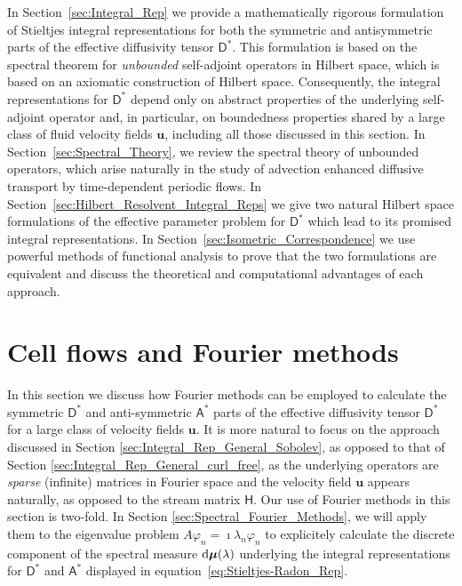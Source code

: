 \documentclass[leqno,onefignum,onetabnum]{siamltex1213}
\newcommand{\secref}[1]{Section~\ref{#1}}
\renewcommand{\d}{\mathrm{d}}
\newcommand{\Dm}{\mathsf{D}}
\newcommand{\Hm}{\mathsf{H}}
\newcommand{\Am}{\mathsf{A}}
\newcommand\bmu{\mbox{\boldmath${\mu}$}}
\newcommand{\vecu}{\boldsymbol{u}}
\begin{document}
In \secref{sec:Integral_Rep} we provide a mathematically rigorous
formulation of Stieltjes integral representations for both the
symmetric and antisymmetric parts of the effective diffusivity tensor
$\Dm^*$. This formulation is based on the spectral theorem for
\emph{unbounded} self-adjoint operators in  Hilbert space, which is
based on an axiomatic construction of Hilbert 
space. Consequently, the integral representations for $\Dm^*$ depend
only on abstract properties of the underlying self-adjoint operator
and, in particular, on boundedness properties shared by a large
class of fluid velocity fields $\vecu$, including all those
discussed in this section. In \secref{sec:Spectral_Theory}, we
review the spectral theory of unbounded operators, which arise
naturally in the study of advection enhanced diffusive transport by
time-dependent periodic flows. In
\secref{sec:Hilbert_Resolvent_Integral_Reps} we give two natural
Hilbert space formulations of the effective parameter problem for
$\Dm^*$ which lead to its promised integral representations. In
\secref{sec:Isometric_Correspondence} we use powerful methods of
functional analysis to prove that the two formulations are equivalent
and discuss the theoretical and computational advantages of each
approach.  




\section{Cell flows and Fourier methods}\label{sec:Fourier_Methods}
%
In this section we discuss how Fourier methods can be employed to
calculate the symmetric $\Dm^*$ and anti-symmetric $\Am^*$
parts of the effective diffusivity tensor $\Dm^*$ for a large class
of velocity fields $\vecu $. It is more natural  to focus on the
approach discussed in Section \ref{sec:Integral_Rep_General_Sobolev},
as opposed to that of Section
\ref{sec:Integral_Rep_General_curl_free}, as the underlying operators
are \emph{sparse} (infinite) matrices in Fourier space and the 
velocity field $\vecu $ appears naturally, as opposed to the stream
matrix $\Hm$. Our use of Fourier methods in this section is
two-fold. In Section \ref{sec:Spectral_Fourier_Methods}, we will apply
them to the eigenvalue problem $A\varphi_n=\imath\lambda_n\varphi_n$
to explicitely calculate the discrete component of the spectral
measure $\d\bmu(\lambda)$ underlying the integral representations for
$\Dm^*$ and $\Am^*$ displayed in
equation~\eqref{eq:Stieltjes-Radon_Rep}.  
\end{document}
